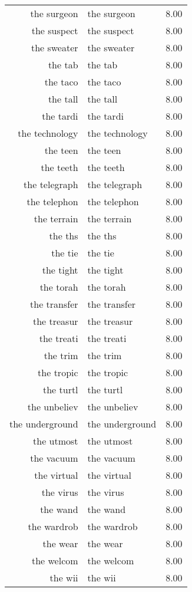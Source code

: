 \begin{table}[ht]
\begin{tabular}{rlr}
  the surgeon & the surgeon & 8.00 \\ 
  the suspect & the suspect & 8.00 \\ 
  the sweater & the sweater & 8.00 \\ 
  the tab & the tab & 8.00 \\ 
  the taco & the taco & 8.00 \\ 
  the tall & the tall & 8.00 \\ 
  the tardi & the tardi & 8.00 \\ 
  the technology & the technology & 8.00 \\ 
  the teen & the teen & 8.00 \\ 
  the teeth & the teeth & 8.00 \\ 
  the telegraph & the telegraph & 8.00 \\ 
  the telephon & the telephon & 8.00 \\ 
  the terrain & the terrain & 8.00 \\ 
  the ths & the ths & 8.00 \\ 
  the tie & the tie & 8.00 \\ 
  the tight & the tight & 8.00 \\ 
  the torah & the torah & 8.00 \\ 
  the transfer & the transfer & 8.00 \\ 
  the treasur & the treasur & 8.00 \\ 
  the treati & the treati & 8.00 \\ 
  the trim & the trim & 8.00 \\ 
  the tropic & the tropic & 8.00 \\ 
  the turtl & the turtl & 8.00 \\ 
  the unbeliev & the unbeliev & 8.00 \\ 
  the underground & the underground & 8.00 \\ 
  the utmost & the utmost & 8.00 \\ 
  the vacuum & the vacuum & 8.00 \\ 
  the virtual & the virtual & 8.00 \\ 
  the virus & the virus & 8.00 \\ 
  the wand & the wand & 8.00 \\ 
  the wardrob & the wardrob & 8.00 \\ 
  the wear & the wear & 8.00 \\ 
  the welcom & the welcom & 8.00 \\ 
  the wii & the wii & 8.00 \\ 

\end{tabular}
\end{table}
